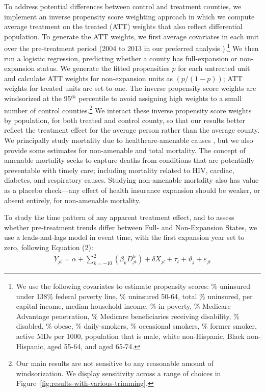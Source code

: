 \documentclass[12pt]{article}%
\begin{document}
To address potential differences between control and treatment counties, we implement an inverse propensity score weighting approach in which we compute average treatment on the treated (ATT) weights that also reflect differential population.  
To generate the ATT weights, we first average covariates in each unit over the pre-treatment period (2004 to 2013 in our preferred analysis ).\footnote{We use the following covariates to estimate propensity scores: \% uninsured under 138\% federal poverty line, \% uninsured 50-64, total \% uninsured, per capital income, median household income, \% in poverty, \% Medicare Advantage penetration, \% Medicare beneficiaries receiving disability, \% disabled, \% obese, \% daily-smokers, \% occasional smokers, \% former smoker, active MDs per 1000,  population that is male, white non-Hispanic, Black non-Hispanic, aged 55-64, and aged 65-74.} 
We then run a logistic regression, predicting whether a county has  full-expansion or non-expansion status. 
We generate the fitted propensities $p$ for each untreated unit and calculate ATT weights for non-expansion units as $(p/(1-p))$; ATT weights for treated units are set to one. 
The inverse propensity score weights are windsorized at the 95$^{th}$ percentile to avoid assigning high weights to a small number of control counties.\footnote{Our main results are not sensitive to any reasonable amount of windsorization. We display sensitivity across a range of choices in Figure~\ref{fig:results-with-various-trimming}.}
We interact these inverse propensity score weights by population, for both treated and control county, so that our results better reflect the treatment effect for the average person rather than the average county.  
We principally study mortality due to healthcare-amenable causes \citep{Nolte1129}, but we also provide some estimates for non-amenable and total mortality.  
The concept of amenable mortality seeks to capture deaths from conditions that are potentially preventable with timely care; including mortality related to HIV, cardiac, diabetes, and respiratory causes. 
Studying non-amenable mortality also has value as a placebo check---any effect of health insurance expansion should be weaker, or absent entirely, for non-amenable mortality.

To study the time pattern of any apparent treatment effect, and to assess whether pre-treatment trends differ between Full- and Non-Expansion States, we use a leads-and-lags model in event time, with the first expansion year set to zero, following Equation (2):
\vspace{-.5cm}
\begin{align}
    Y_{jt}=\alpha + \sum^{2}_{k=-10} (\beta_{k} D_{jt}^{k}) + \delta X_{jt} + \tau_{t} + \vartheta_{j} + \varepsilon_{jt} \label{eq:event-study-dd}
\end{align}
\end{document}
